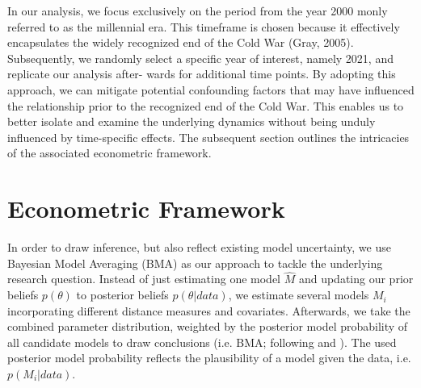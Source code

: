 \documentclass[12pt,a4paper]{article}
\begin{document}
In our analysis, we focus exclusively on the period from the year 2000
monly referred to as the millennial era. This timeframe is chosen because it effectively encapsulates the widely recognized end of the Cold War (Gray, 2005). Subsequently, we randomly select a specific year of interest, namely 2021, and replicate our analysis after- wards for additional time points. By adopting this approach, we can mitigate potential confounding factors that may have influenced the relationship prior to the recognized end of the Cold War. This enables us to better isolate and examine the underlying dynamics without being unduly influenced by time-specific effects. The subsequent section outlines the intricacies of the associated econometric framework.
 
\section{Econometric Framework}
In order to draw inference, but also reflect existing model uncertainty, we use Bayesian Model Averaging (BMA) as our approach to tackle the underlying research question.  Instead of just estimating one model $\hat{M}$ and updating our prior beliefs $p(\theta)$ to posterior beliefs $p(\theta \vert data)$, we estimate several models $M_{i}$ incorporating different distance measures and covariates. Afterwards, we take the combined parameter distribution, weighted by the posterior model probability of all candidate models to draw conclusions (i.e. BMA; following \citealp{jeffreys1939} and \citealp{jevons1874}). The used posterior model probability reflects the plausibility of a model given the data, i.e. $p(M_{i} \vert data)$.
\end{document}

